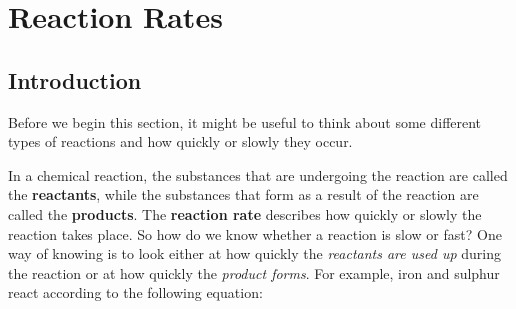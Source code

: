 \chapter{Reaction Rates}
\label{chap:ReactionRates}



\section{Introduction}

Before we begin this section, it might be useful to think about some different types of reactions and how quickly or slowly they occur.

In a chemical reaction, the substances that are undergoing the reaction are called the \textbf{reactants}, while the substances that form as a result of the reaction are called the \textbf{products}. The \textbf{reaction rate} describes how quickly or slowly the reaction takes place. So how do we know whether a reaction is slow or fast? One way of knowing is to look either at how quickly the \textit{reactants are used up} during the reaction or at how quickly the \textit{product forms}. For example, iron and sulphur react according to the following equation:

